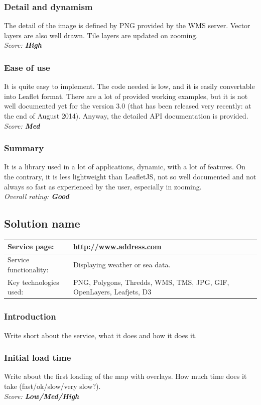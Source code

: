 \documentclass[11pt,a4paper,titlepage,oneside]{report}
\begin{document}
  \subsubsection{Detail and dynamism}
  The detail of the image is defined by PNG provided by the WMS server. Vector layers are also well drawn. Tile layers are updated on zooming.
  \\ \emph{Score: \textbf{High}}
  \subsubsection{Ease of use}
  It is quite easy to implement. The code needed is low, and it is easily convertable into Leaflet format. There are a lot of provided working examples, but it is not well documented yet for the version 3.0 (that has been released very recently: at the end of August 2014). Anyway, the detailed API documentation is provided.
  \\ \emph{Score: \textbf{Med}}
  \subsubsection{Summary}
  It is a library used in a lot of applications, dynamic, with a lot of features. On the contrary, it is less lightweight than LeafletJS, not so well documented and not always so fast as experienced by the user, especially in zooming.
  \\ \emph{Overall rating: \textbf{Good}}

\subsection{Solution name}
\begin{tabular}{|p{4cm}|p{8cm}|}

\hline
Service page: & \url{http://www.address.com} \\%
\hline
Service functionality: & Displaying weather or sea data. \\
\hline
Key technologies used: & PNG, Polygons, Thredds, WMS, TMS, JPG, GIF, OpenLayers, Leafjets, D3 \\
\hline
\end{tabular}
\subsubsection{Introduction}
Write short about the service, what it does and how it does it.
\subsubsection{Initial load time}
Write about the first loading of the map with overlays. How much time does it take (fast/ok/slow/very slow?).
\\ \emph{Score: \textbf{Low/Med/High}}
\end{document}
